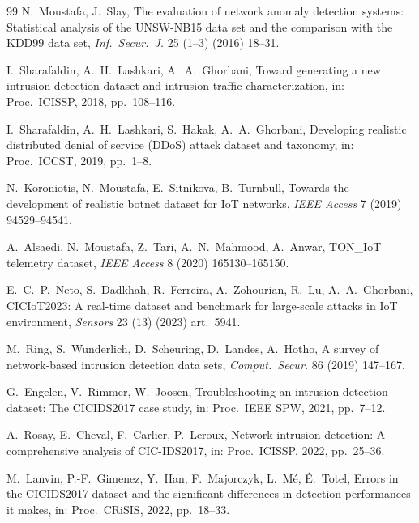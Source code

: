 \documentclass[preprint,12pt,authoryear]{elsarticle}
\begin{document}
\begin{thebibliography}{99}
N.~Moustafa, J.~Slay, The evaluation of network anomaly detection systems:
Statistical analysis of the UNSW-NB15 data set and the comparison with the KDD99
data set, \textit{Inf.\ Secur.\ J.} 25 (1--3) (2016) 18--31.

I.~Sharafaldin, A.~H.~Lashkari, A.~A.~Ghorbani, Toward generating a new intrusion
detection dataset and intrusion traffic characterization, in: Proc.\ ICISSP, 2018,
pp.~108--116.

I.~Sharafaldin, A.~H.~Lashkari, S.~Hakak, A.~A.~Ghorbani, Developing realistic
distributed denial of service (DDoS) attack dataset and taxonomy, in: Proc.\ ICCST,
2019, pp.~1--8.

N.~Koroniotis, N.~Moustafa, E.~Sitnikova, B.~Turnbull, Towards the development of
realistic botnet dataset for IoT networks, \textit{IEEE Access} 7 (2019)
94529--94541.

A.~Alsaedi, N.~Moustafa, Z.~Tari, A.~N.~Mahmood, A.~Anwar, TON\_IoT telemetry
dataset, \textit{IEEE Access} 8 (2020) 165130--165150.

E.~C.~P.~Neto, S.~Dadkhah, R.~Ferreira, A.~Zohourian, R.~Lu, A.~A.~Ghorbani,
CICIoT2023: A real-time dataset and benchmark for large-scale attacks in IoT
environment, \textit{Sensors} 23 (13) (2023) art.~5941.

M.~Ring, S.~Wunderlich, D.~Scheuring, D.~Landes, A.~Hotho, A survey of
network-based intrusion detection data sets, \textit{Comput.\ Secur.} 86 (2019)
147--167.

G.~Engelen, V.~Rimmer, W.~Joosen, Troubleshooting an intrusion detection dataset:
The CICIDS2017 case study, in: Proc.\ IEEE SPW, 2021, pp.~7--12.

A.~Rosay, E.~Cheval, F.~Carlier, P.~Leroux, Network intrusion detection: A
comprehensive analysis of CIC-IDS2017, in: Proc.\ ICISSP, 2022, pp.~25--36.

M.~Lanvin, P.-F.~Gimenez, Y.~Han, F.~Majorczyk, L.~M\'e, \'E.~Totel, Errors in the
CICIDS2017 dataset and the significant differences in detection performances it
makes, in: Proc.\ CRiSIS, 2022, pp.~18--33.


\end{thebibliography}
\end{document}
